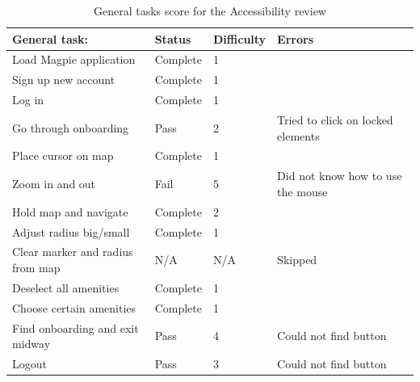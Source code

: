 \begin{table}[h!]
    \centering
    \caption{General tasks score for the Accessibility review}
    \begin{tabular}{|p{}|p{}|p{}|p{}|}
        \hline
        \textbf{General task:}           & \textbf{Status} & \textbf{Difficulty} & \textbf{Errors}                   \\
        \hline
        Load Magpie application          & Complete        & 1                   &                                   \\
        \hline
        Sign up new account              & Complete        & 1                   &                                   \\
        \hline
        Log in                           & Complete        & 1                   &                                   \\
        \hline
        Go through onboarding            & Pass            & 2                   & Tried to click on locked elements \\
        \hline
        Place cursor on map              & Complete        & 1                   &                                   \\
        \hline
        Zoom in and out                  & Fail            & 5                   & Did not know how to use the mouse \\
        \hline
        Hold map and navigate            & Complete        & 2                   &                                   \\
        \hline
        Adjust radius big/small          & Complete        & 1                   &                                   \\
        \hline
        Clear marker and radius from map & N/A             & N/A                 & Skipped                           \\
        \hline
        Deselect all amenities           & Complete        & 1                   &                                   \\
        \hline
        Choose certain amenities         & Complete        & 1                   &                                   \\
        \hline
        Find onboarding and exit midway  & Pass            & 4                   & Could not find button             \\
        \hline
        Logout                           & Pass            & 3                   & Could not find button             \\
        \hline
    \end{tabular}
\end{table}

